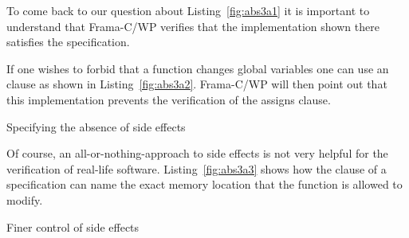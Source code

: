 To come back to our question about Listing~\ref{fig:abs3a1} it is important
to understand that Frama-C\slash WP verifies that the implementation shown there
satisfies the specification.

If one wishes to forbid that a function changes global variables
one can use an  clause as shown in Listing~\ref{fig:abs3a2}.
Frama-C\slash WP will then point out that this implementation prevents
the verification of the assigns clause.

\begin{listing}[hbt]
\begin{minipage}{\textwidth}

\end{minipage}
\caption{\label{fig:abs3a2} Specifying the absence of side effects}
\end{listing}


\clearpage

Of course, an all-or-nothing-approach to side effects is not very helpful
for the verification of real-life software.
Listing~\ref{fig:abs3a3} shows how the  clause of a
specification can name the exact memory location that the
function is allowed to modify.

\begin{listing}[hbt]
\begin{minipage}{\textwidth}

\end{minipage}
\caption{\label{fig:abs3a3} Finer control of side effects}
\end{listing}


